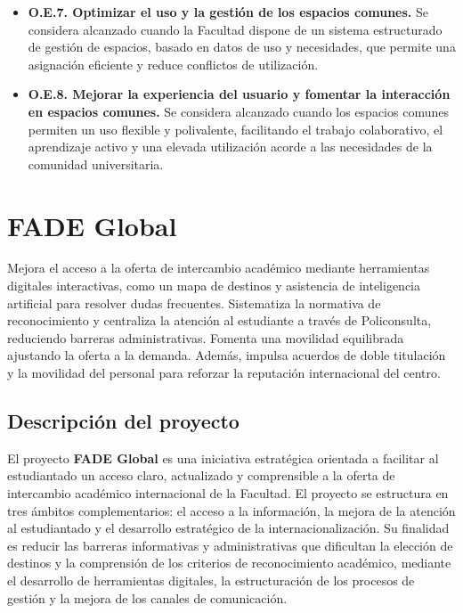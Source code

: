 \documentclass[11pt,a4paper]{scrreprt}
\begin{document}
\begin{itemize}
\item \textbf{O.E.7. Optimizar el uso y la gestión de los espacios comunes.}  
Se considera alcanzado cuando la Facultad dispone de un sistema estructurado de gestión de espacios, basado en datos de uso y necesidades, que permite una asignación eficiente y reduce conflictos de utilización.

\item \textbf{O.E.8. Mejorar la experiencia del usuario y fomentar la interacción en espacios comunes.}  
Se considera alcanzado cuando los espacios comunes permiten un uso flexible y polivalente, facilitando el trabajo colaborativo, el aprendizaje activo y una elevada utilización acorde a las necesidades de la comunidad universitaria.

\end{itemize}
\clearpage

\chapter[FADE Global]{\textcolor{fgcolor}{FADE Global}}
\begin{tcolorbox}[descbox]
\small Mejora el acceso a la oferta de intercambio académico mediante herramientas digitales interactivas, como un mapa de destinos y asistencia de inteligencia artificial para resolver dudas frecuentes. Sistematiza la normativa de reconocimiento y centraliza la atención al estudiante a través de Policonsulta, reduciendo barreras administrativas. Fomenta una movilidad equilibrada ajustando la oferta a la demanda. Además, impulsa acuerdos de doble titulación y la movilidad del personal para reforzar la reputación internacional del centro.
\end{tcolorbox}

\section{Descripción del proyecto}

\small
El proyecto \textbf{FADE Global} es una iniciativa estratégica orientada a facilitar al estudiantado un acceso claro, actualizado y comprensible a la oferta de intercambio académico internacional de la Facultad. El proyecto se estructura en tres ámbitos complementarios: el acceso a la información, la mejora de la atención al estudiantado y el desarrollo estratégico de la internacionalización. Su finalidad es reducir las barreras informativas y administrativas que dificultan la elección de destinos y la comprensión de los criterios de reconocimiento académico, mediante el desarrollo de herramientas digitales, la estructuración de los procesos de gestión y la mejora de los canales de comunicación.
\end{document}
